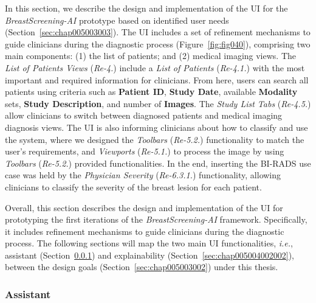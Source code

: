 In this section, we describe the design and implementation of the \ac{UI} for the {\it BreastScreening-AI} prototype based on identified user needs (Section~\ref{sec:chap005003003}).
The \ac{UI} includes a set of refinement mechanisms to guide clinicians during the diagnostic process (Figure~\ref{fig:fig040}), comprising two main components:
(1) the list of patients; and
(2) medical imaging views.
The \textcolor{revised}{{\it List of Patients Views} ({\it Re-4.})} include a \textcolor{revised}{{\it List of Patients} ({\it Re-4.1.})} with the most important and required information for clinicians.
From here, users can search all patients using criteria such as {\bf Patient ID}, {\bf Study Date}, available {\bf Modality} sets, {\bf Study Description}, and number of {\bf Images}.
The \textcolor{revised}{{\it Study List Tabs} ({\it Re-4.5.})} allow clinicians to switch between diagnosed patients and medical imaging diagnosis views.
The \ac{UI} is also informing clinicians about how to classify and use the system, where we designed the \textcolor{revised}{{\it Toolbars} ({\it Re-5.2.})} functionality to match the user's requirements, and \textcolor{revised}{{\it Viewports} ({\it Re-5.1.})} to process the image by using \textcolor{revised}{{\it Toolbars} ({\it Re-5.2.})} provided functionalities.
In the end, \textcolor{revised}{inserting the \ac{BI-RADS} use case was held by the {\it Physician Severity} ({\it Re-6.3.1.}) functionality}, allowing clinicians to classify the severity of the breast lesion for each patient.

Overall, this section describes the design and implementation of the \ac{UI} for prototyping the first iterations of the {\it BreastScreening-AI} framework.
Specifically, it includes refinement mechanisms to guide clinicians during the diagnostic process.
The following sections will map the two main \ac{UI} functionalities, {\it i.e.}, assistant (Section~\ref{sec:chap005004002001}) and explainability (Section~\ref{sec:chap005004002002}), between the design goals (Section~\ref{sec:chap005003002}) under this thesis.

\subsubsection{Assistant}
\label{sec:chap005004002001}

